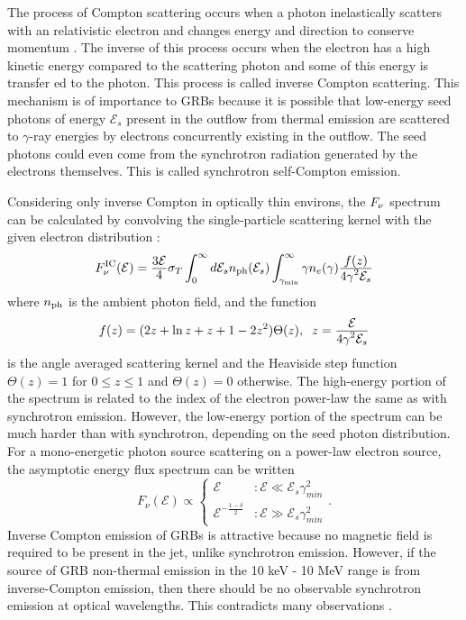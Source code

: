 The process of Compton scattering occurs when a photon inelastically
scatters with an relativistic electron and changes energy and
direction to conserve momentum \cite{rybicki:1979}. The inverse of
this process occurs when the electron has a high kinetic energy
compared to the scattering photon and some of this energy is transfer
ed to the photon. This process is called inverse Compton
scattering. This mechanism is of importance to GRBs because it is
possible that low-energy seed photons of energy $\mathcal{E}_s$ present in
the outflow from thermal emission are scattered to $\gamma$-ray
energies by electrons concurrently existing in the outflow. The seed
photons could even come from the synchrotron radiation generated by
the electrons themselves. This is called synchrotron self-Compton
emission.

Considering only inverse Compton in optically thin environs, the $F_{\nu}$
spectrum can be calculated by convolving the single-particle
scattering kernel with the given electron distribution
\cite{rybicki:1979,Baring:2004}:
\begin{equation}
  \label{eq:ic}
  F_{\nu}^{\rm IC}(\mathcal{E}) = \dover{3 \mathcal{E}}{4}\sigma_{T}\int_0^{\infty}d\mathcal{E}_s n_{\rm ph}(\mathcal{E}_s)\int_{\gamma_{\rm min}}^{\infty}\gamma n_e(\gamma)\dover{f(z)}{4 \gamma^2 \mathcal{E}_s}
\end{equation}
where $n_{\rm ph}$ is the ambient photon field, and the function
\begin{equation}
  \label{eq:fz}
  f(z)=(2z+\ln z+z+1-2z^2)\Theta(z),\;\;z=\dover{\mathcal{E}}{4 \gamma^2 \mathcal{E}_s}
\end{equation}
is the angle averaged scattering kernel and the Heaviside step
function $\Theta(z)=1$ for $0\le z \le 1$ and $\Theta(z)=0$
otherwise. The high-energy portion of the spectrum is related to the
index of the electron power-law the same as with synchrotron
emission. However, the low-energy portion of the spectrum can be much
harder than with synchrotron, depending on the seed photon
distribution. For a mono-energetic photon source scattering on a
power-law electron source, the asymptotic energy flux spectrum can be
written
\begin{equation}
  \label{eq:icflux}
   F_{\nu}(\mathcal{E})\propto\left\{
     \begin{array}{lr}
       \mathcal{E} & : \mathcal{E}\ll \mathcal{E}_s \gamma_{min}^2\\
       \mathcal{E}^{-\frac{1-\delta}{2} }& : \mathcal{E}\gg \mathcal{E}_s \gamma_{min}^2
     \end{array}.
   \right.
\end{equation}
Inverse Compton emission of GRBs is attractive because no magnetic
field is required to be present in the jet, unlike synchrotron
emission. However, if the source of GRB non-thermal emission in the 10
keV - 10 MeV range is from inverse-Compton emission, then there should
be no observable synchrotron emission at optical wavelengths. This
contradicts many observations \cite{}.

